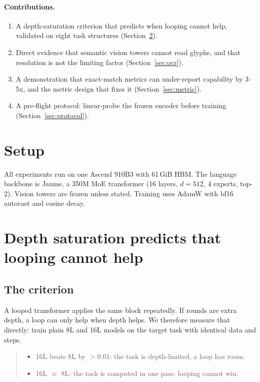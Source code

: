 \documentclass[10pt,twocolumn,letterpaper]{article}
\begin{document}
\paragraph{Contributions.}
\begin{enumerate}[leftmargin=1.2em,itemsep=1pt,topsep=2pt]
\item A depth-saturation criterion that predicts when looping cannot help,
      validated on eight task structures (Section~\ref{sec:loop}).
\item Direct evidence that semantic vision towers cannot read glyphs, and
      that resolution is not the limiting factor (Section~\ref{sec:ocr}).
\item A demonstration that exact-match metrics can under-report capability by
      3--5x, and the metric design that fixes it (Section~\ref{sec:metric}).
\item A pre-flight protocol: linear-probe the frozen encoder before training
      (Section~\ref{sec:protocol}).
\end{enumerate}

\section{Setup}

All experiments run on one Ascend 910B3 with 61\,GiB HBM. The language
backbone is Jaume, a 350M MoE transformer (16 layers, $d=512$, 4 experts,
top-2). Vision towers are frozen unless stated. Training uses AdamW with
bf16 autocast and cosine decay.

\section{Depth saturation predicts that looping cannot help}
\label{sec:loop}

\subsection{The criterion}

A looped transformer applies the same block repeatedly. If rounds are extra
depth, a loop can only help when depth helps. We therefore measure that
directly: train plain 8L and 16L models on the target task with identical data
and steps.

\begin{quote}
\begin{itemize}[leftmargin=1em,itemsep=1pt,topsep=2pt]
\item 16L beats 8L by $>0.01$: the task is depth-limited, a loop has room.
\item 16L $\approx$ 8L: the task is computed in one pass; looping cannot win.
\end{itemize}
\end{quote}
\end{document}
